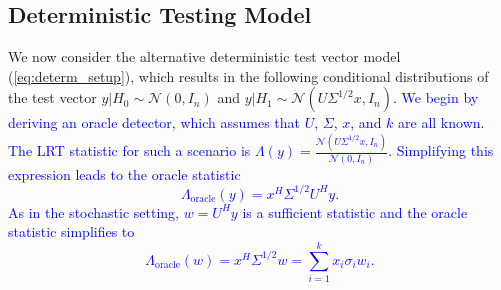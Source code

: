 \subsection{Deterministic Testing Model}\label{sec:plugin_determ}
We now consider the alternative deterministic test vector model (\ref{eq:determ_setup}), which results in the following conditional distributions of the test vector $y|H_0\sim\mathcal{N}(0,I_n)$ and $y|H_1\sim\mathcal{N}(U\Sigma^{1/2} x, I_n)$. \textcolor{blue}{We begin by deriving an oracle detector, which assumes that $U$, $\Sigma$, $x$, and $k$ are all known. The LRT statistic for such a scenario is $\Lambda(y) = \frac{\mathcal{N}(U\Sigma^{1/2} x, I_n)}{\mathcal{N}(0,I_n)}$. Simplifying this expression leads to the oracle statistic
\begin{equation}\label{eq:determ_stat_oracle_y}
\Lambda_{\text{oracle}}(y) = x^H\Sigma^{1/2}U^Hy.
\end{equation}
As in the stochastic setting, $w=U^Hy$ is a sufficient statistic and the oracle statistic simplifies to
\begin{equation}\label{eq:determ_stat_oracle_w}
\boxed{\Lambda_{\text{oracle}}(w) = x^H\Sigma^{1/2}w = \sum_{i=1}^kx_i\sigma_iw_i.}
\end{equation}}

